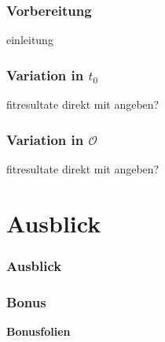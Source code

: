 \documentclass[hyperref={pdfpagelabels=false}]{beamer}
\begin{document}
\begin{frame}
 \frametitle{Vorbereitung}
 einleitung
\end{frame}

\begin{frame}
 \frametitle{Variation in $t_0$}
 fitresultate direkt mit angeben?
\end{frame}

\begin{frame}
 \frametitle{Variation in $\mathcal{O}$}
 fitresultate direkt mit angeben?
\end{frame}

\section{Ausblick}
\begin{frame}
\tableofcontents[currentsection]
\end{frame}

\begin{frame}
 \frametitle{Ausblick}
\end{frame}



\begin{frame}
\frametitle{Bonus}
\textbf{Bonusfolien}
\end{frame}
\end{document}
